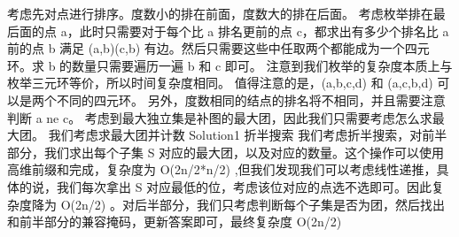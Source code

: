 {}考虑先对点进行排序。度数小的排在前面，度数大的排在后面。\markdownRendererParagraphSeparator
{}考虑枚举排在最后面的点 \markdownRendererDollarSign{}a\markdownRendererDollarSign{}，此时只需要对于每个比 \markdownRendererDollarSign{}a\markdownRendererDollarSign{} 排名更前的点 \markdownRendererDollarSign{}c\markdownRendererDollarSign{}，都求出有多少个排名比 \markdownRendererDollarSign{}a\markdownRendererDollarSign{} 前的点 \markdownRendererDollarSign{}b\markdownRendererDollarSign{} 满足 \markdownRendererDollarSign{}(a,b)(c,b)\markdownRendererDollarSign{} 有边。然后只需要这些中任取两个都能成为一个四元环。求 \markdownRendererDollarSign{}b\markdownRendererDollarSign{} 的数量只需要遍历一遍 \markdownRendererDollarSign{}b\markdownRendererDollarSign{} 和 \markdownRendererDollarSign{}c\markdownRendererDollarSign{} 即可。\markdownRendererParagraphSeparator
{}注意到我们枚举的复杂度本质上与枚举三元环等价，所以时间复杂度相同。\markdownRendererParagraphSeparator
{}值得注意的是，\markdownRendererDollarSign{}(a,b,c,d)\markdownRendererDollarSign{} 和 \markdownRendererDollarSign{}(a,c,b,d)\markdownRendererDollarSign{} 可以是两个不同的四元环。\markdownRendererParagraphSeparator
{}另外，度数相同的结点的排名将不相同，并且需要注意判断 \markdownRendererDollarSign{}a \markdownRendererBackslash{}ne c\markdownRendererDollarSign{}。\markdownRendererInterblockSeparator
{}\markdownRendererInterblockSeparator
{}
\markdownRendererSectionEnd 
\markdownRendererSectionEnd \markdownRendererSectionBegin
{}\markdownRendererInterblockSeparator
{}考虑到最大独立集是补图的最大团，因此我们只需要考虑怎么求最大团。\markdownRendererParagraphSeparator
{}我们考虑求最大团并计数\markdownRendererParagraphSeparator
{}\markdownRendererDollarSign{} Solution1 \markdownRendererDollarSign{}折半搜索\markdownRendererParagraphSeparator
{}我们考虑折半搜索，对前半部分，我们求出每个子集\markdownRendererDollarSign{} S \markdownRendererDollarSign{}对应的最大团，以及对应的数量。这个操作可以使用高维前缀和完成，复杂度为\markdownRendererDollarSign{} O(2\markdownRendererCircumflex{}\markdownRendererLeftBrace{}n/2\markdownRendererRightBrace{}*\markdownRendererLeftBrace{}n/2\markdownRendererRightBrace{}) \markdownRendererDollarSign{},但我们发现我们可以考虑线性递推，具体的说，我们每次拿出\markdownRendererDollarSign{} S \markdownRendererDollarSign{}对应最低的位，考虑该位对应的点选不选即可。因此复杂度降为\markdownRendererDollarSign{} O(2\markdownRendererCircumflex{}\markdownRendererLeftBrace{}n/2\markdownRendererRightBrace{}) \markdownRendererDollarSign{}。对后半部分，我们只考虑判断每个子集是否为团，然后找出和前半部分的兼容掩码，更新答案即可，最终复杂度\markdownRendererDollarSign{} O(2\markdownRendererCircumflex{}\markdownRendererLeftBrace{}n/2\markdownRendererRightBrace{}) \markdownRendererDollarSign{}\markdownRendererInterblockSeparator
